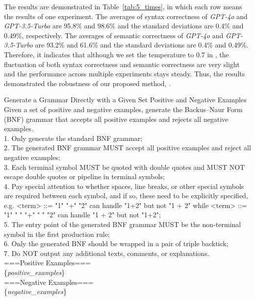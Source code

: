The results are demonstrated in Table~\ref{tab:5_times}, in which each row means the results of one experiment. The averages of syntax correctness of \textit{GPT-4o} and \textit{GPT-3.5-Turbo} are 95.8\% and 98.6\% and the standard deviations are 0.4\% and 0.49\%, respectively. The averages of semantic correctness of \textit{GPT-4o} and \textit{GPT-3.5-Turbo} are 93.2\% and 61.6\% and the standard deviations are 0.4\% and 0.49\%. Therefore, it indicates that although we set the temperature to 0.7 in \NAME, the fluctuation of both syntax correctness and semantic correctness are very slight and the performance across multiple experiments stays steady. Thus, the results demonstrated the robustness of our proposed method, \NAME.



\begin{promptblock}{Generate a Grammar Directly with a Given Set Positive and Negative Examples}
\label{prompt:direct_prompting}
Given a set of positive and negative examples, generate the Backus–Naur Form (BNF) grammar that accepts all positive examples and rejects all negative examples.\\
1. Only generate the standard BNF grammar;\\
2. The generated BNF grammar MUST accept all positive examples and reject all negative examples;\\
3. Each terminal symbol MUST be quoted with double quotes and MUST NOT escape double quotes or pipeline in terminal symbols;\\
4. Pay special attention to whether spaces, line breaks, or other special symbols are required between each symbol, and if so, these need to be explicitly specified, e.g. <term> ::= "1" "+" "2" can handle "1+2" but not "1 + 2" while <term> ::= "1" " " "+" " " "2" can handle "1 + 2" but not "1+2";\\
5. The entry point of the generated BNF grammar MUST be the non-terminal symbol in the first production rule;\\
6. Only the generated BNF should be wrapped in a pair of triple backtick;\\
7. Do NOT output any additional texts, comments, or explanations.\\
\vspace{\baselineskip}
===Positive Examples===\\
\{\textit{positive\_examples}\}\\
===Negative Examples===\\
\{\textit{negative\_examples}\}\\
\end{promptblock}

